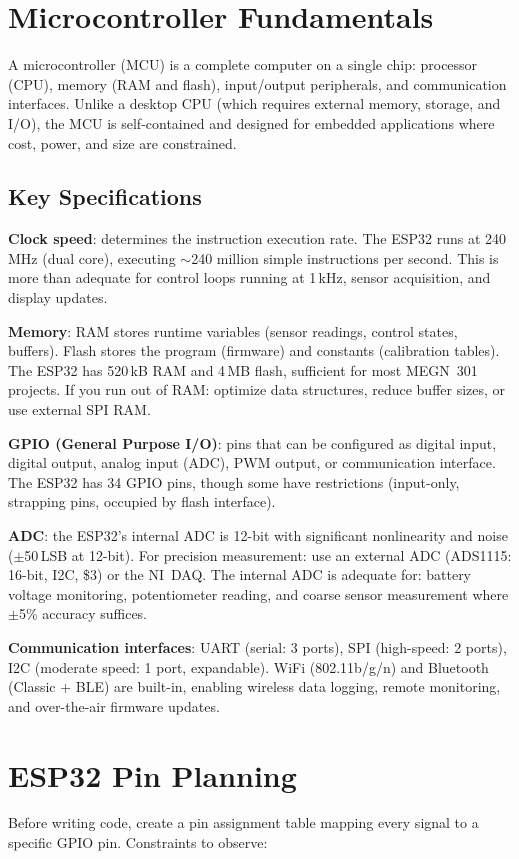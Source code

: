 \documentclass[11pt,letterpaper,twoside,openany]{book}
\begin{document}
\section{Microcontroller Fundamentals}
A microcontroller (MCU) is a complete computer on a single chip: processor (CPU), memory (RAM and flash), input/output peripherals, and communication interfaces. Unlike a desktop CPU (which requires external memory, storage, and I/O), the MCU is self-contained and designed for embedded applications where cost, power, and size are constrained.

\subsection{Key Specifications}
\textbf{Clock speed}: determines the instruction execution rate. The ESP32 runs at 240\,MHz (dual core), executing $\sim$240 million simple instructions per second. This is more than adequate for control loops running at 1\,kHz, sensor acquisition, and display updates.

\textbf{Memory}: RAM stores runtime variables (sensor readings, control states, buffers). Flash stores the program (firmware) and constants (calibration tables). The ESP32 has 520\,kB RAM and 4\,MB flash, sufficient for most MEGN~301 projects. If you run out of RAM: optimize data structures, reduce buffer sizes, or use external SPI RAM.

\textbf{GPIO (General Purpose I/O)}: pins that can be configured as digital input, digital output, analog input (ADC), PWM output, or communication interface. The ESP32 has 34 GPIO pins, though some have restrictions (input-only, strapping pins, occupied by flash interface).

\textbf{ADC}: the ESP32's internal ADC is 12-bit with significant nonlinearity and noise ($\pm$50\,LSB at 12-bit). For precision measurement: use an external ADC (ADS1115: 16-bit, I2C, \$3) or the NI~DAQ. The internal ADC is adequate for: battery voltage monitoring, potentiometer reading, and coarse sensor measurement where $\pm$5\% accuracy suffices.

\textbf{Communication interfaces}: UART (serial: 3 ports), SPI (high-speed: 2 ports), I2C (moderate speed: 1 port, expandable). WiFi (802.11b/g/n) and Bluetooth (Classic + BLE) are built-in, enabling wireless data logging, remote monitoring, and over-the-air firmware updates.

\section{ESP32 Pin Planning}
Before writing code, create a pin assignment table mapping every signal to a specific GPIO pin. Constraints to observe:
\end{document}
